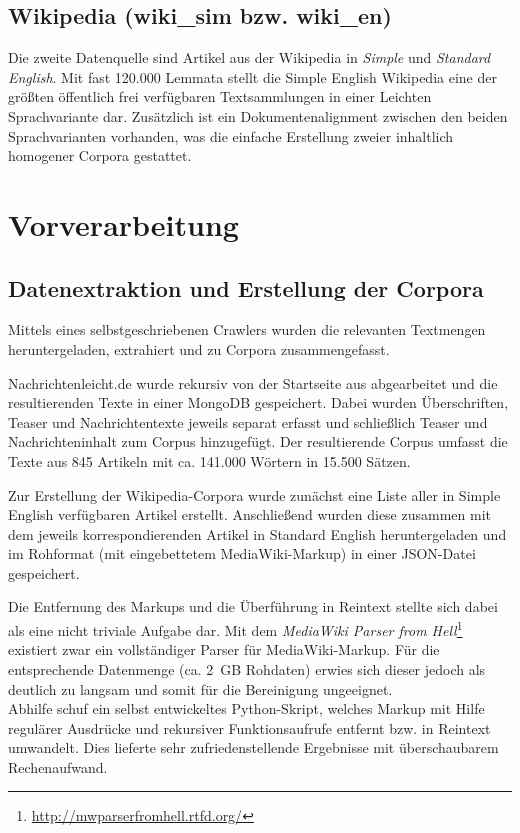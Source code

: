 \documentclass[11pt, a4paper]{article}
\begin{document}
\subsection{Wikipedia (wiki\_sim bzw. wiki\_en)}
\label{corp-wiki}
Die zweite Datenquelle sind Artikel aus der Wikipedia in \emph{Simple} und
\emph{Standard English}. Mit fast 120.000 Lemmata stellt die Simple English
Wikipedia eine der gr\"o\ss{}ten \"offentlich frei verf\"ugbaren Textsammlungen
in einer Leichten Sprachvariante dar.
Zus\"atzlich ist ein Dokumentenalignment zwischen den beiden Sprachvarianten
vorhanden, was die einfache Erstellung zweier inhaltlich homogener Corpora
gestattet.


\section{Vorverarbeitung}
\label{sec:vorverarb}

\subsection{Datenextraktion und Erstellung der Corpora}
\label{datextr}

Mittels eines selbstgeschriebenen Crawlers wurden die relevanten Textmengen
heruntergeladen, extrahiert und zu Corpora zusammengefasst.

Nachrichtenleicht.de wurde rekursiv von der Startseite aus abgearbeitet
und die resultierenden Texte in einer MongoDB gespeichert.
Dabei wurden Überschriften, Teaser und Nachrichtentexte jeweils separat erfasst
und schließlich Teaser und Nachrichteninhalt zum Corpus hinzugefügt.
Der resultierende Corpus umfasst die Texte aus 845 Artikeln mit ca. 141.000
Wörtern in 15.500 Sätzen.

Zur Erstellung der Wikipedia-Corpora wurde zunächst eine Liste aller
in Simple English verfügbaren Artikel erstellt. Anschließend wurden diese
zusammen mit dem jeweils korrespondierenden Artikel in Standard English
heruntergeladen und im Rohformat (mit eingebettetem MediaWiki-Markup) in einer
JSON-Datei gespeichert.

Die Entfernung des Markups und die Überführung in Reintext stellte
sich dabei als eine nicht triviale Aufgabe dar.
Mit dem \emph{MediaWiki Parser from
Hell}\footnote{\url{http://mwparserfromhell.rtfd.org/}} existiert zwar ein
vollständiger Parser für MediaWiki-Markup.
Für die entsprechende Datenmenge (ca. 2~GB Rohdaten) erwies sich dieser jedoch
als deutlich zu langsam und somit für die Bereinigung ungeeignet.
\\
Abhilfe schuf ein selbst entwickeltes Python-Skript, welches Markup mit Hilfe
regul\"arer Ausdr\"ucke und rekursiver Funktionsaufrufe entfernt bzw. in
Reintext umwandelt.
Dies lieferte sehr zufriedenstellende Ergebnisse mit überschaubarem
Rechenaufwand.
\end{document}

